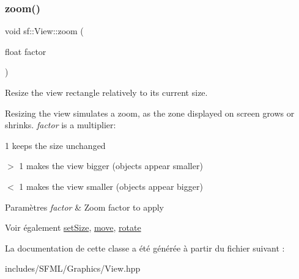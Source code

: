 \subsubsection{\texorpdfstring{zoom()}{zoom()}}
{\footnotesize\ttfamily void sf\+::\+View\+::zoom (\begin{DoxyParamCaption}\item[{float}]{factor }\end{DoxyParamCaption})}



Resize the view rectangle relatively to its current size. 

Resizing the view simulates a zoom, as the zone displayed on screen grows or shrinks. {\itshape factor} is a multiplier\+: \begin{DoxyItemize}
\item 1 keeps the size unchanged \item $>$ 1 makes the view bigger (objects appear smaller) \item $<$ 1 makes the view smaller (objects appear bigger)\end{DoxyItemize}

\begin{DoxyParams}{Paramètres}
{\em factor} & Zoom factor to apply\\
\hline
\end{DoxyParams}
\begin{DoxySeeAlso}{Voir également}
\hyperlink{classsf_1_1View_a9525b73fe9fbaceb9568faf56b399dab}{set\+Size}, \hyperlink{classsf_1_1View_a0c82144b837caf812f7cb25a43d80c41}{move}, \hyperlink{classsf_1_1View_a5fd3901aae1845586ca40add94faa378}{rotate} 
\end{DoxySeeAlso}


La documentation de cette classe a été générée à partir du fichier suivant \+:\begin{DoxyCompactItemize}
\item 
includes/\+S\+F\+M\+L/\+Graphics/View.\+hpp\end{DoxyCompactItemize}
